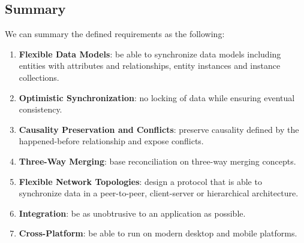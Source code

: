 \subsection{Summary}

We can summary the defined requirements as the following:

\begin{enumerate}
\item \textbf{Flexible Data Models}: be able to synchronize data models including entities with attributes and relationships, entity instances and instance collections.
\item \textbf{Optimistic Synchronization}: no locking of data while ensuring eventual consistency.
\item \textbf{Causality Preservation and Conflicts}: preserve causality defined by the happened-before relationship and expose conflicts.
\item \textbf{Three-Way Merging}: base reconciliation on three-way merging concepts.
\item \textbf{Flexible Network Topologies}: design a protocol that is able to synchronize data in a peer-to-peer, client-server or hierarchical architecture.
\item \textbf{Integration}: be as unobtrusive to an application as possible.
\item \textbf{Cross-Platform}: be able to run on modern desktop and mobile platforms.
\end{enumerate}

